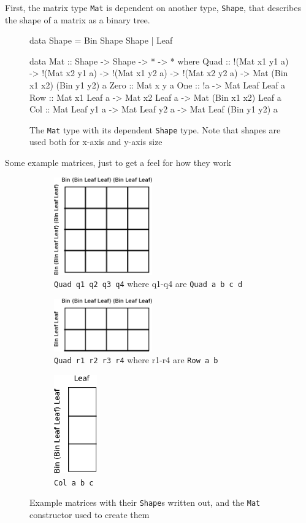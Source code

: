 \documentclass[a4paper,12pt,twosided]{report}
\begin{document}
First, the matrix type \texttt{Mat} is dependent on another type,
\texttt{Shape}, that describes the shape of a matrix as a binary tree.

\begin{figure}[H]
\begin{code}
data Shape = Bin Shape Shape | Leaf

data Mat :: Shape -> Shape -> * -> * where
  Quad :: !(Mat x1 y1 a) -> !(Mat x2 y1 a) ->
          !(Mat x1 y2 a) -> !(Mat x2 y2 a) ->
          Mat (Bin x1 x2) (Bin y1 y2) a
  Zero :: Mat x y a
  One :: !a -> Mat Leaf Leaf a
  Row :: Mat x1 Leaf a -> Mat x2 Leaf a -> Mat (Bin x1 x2) Leaf a
  Col :: Mat Leaf y1 a -> Mat Leaf y2 a -> Mat Leaf (Bin y1 y2) a
\end{code}
\caption{\label{mat}The \texttt{Mat} type with its dependent \texttt{Shape}
type. Note that shapes are used both for x-axis and y-axis size}
\end{figure}

Some example matrices, just to get a feel for how they work
\begin{figure}[H]
\begin{subfigure}[H]{.3\textwidth}
\includegraphics[width=120pt]{example-matrix-4x4.eps}
\caption{\texttt{Quad q1 q2 q3 q4} where q1-q4 are \texttt{Quad a b c d}} 
\end{subfigure}
\hfill
\begin{subfigure}[H]{.3\textwidth}
\includegraphics[width=120pt]{example-matrix-2x4.eps}
\caption{\texttt{Quad r1 r2 r3 r4} where r1-r4 are \texttt{Row a b}}
\end{subfigure}
\hfill
\begin{subfigure}[H]{.25\textwidth}
\includegraphics[height=120pt]{example-matrix-3x1.eps}
\caption{\texttt{Col a b c}}
\end{subfigure}
\caption{Example matrices with their \texttt{Shape}s written out, and the
\texttt{Mat} constructor used to create them}

\end{figure}
\end{document}
